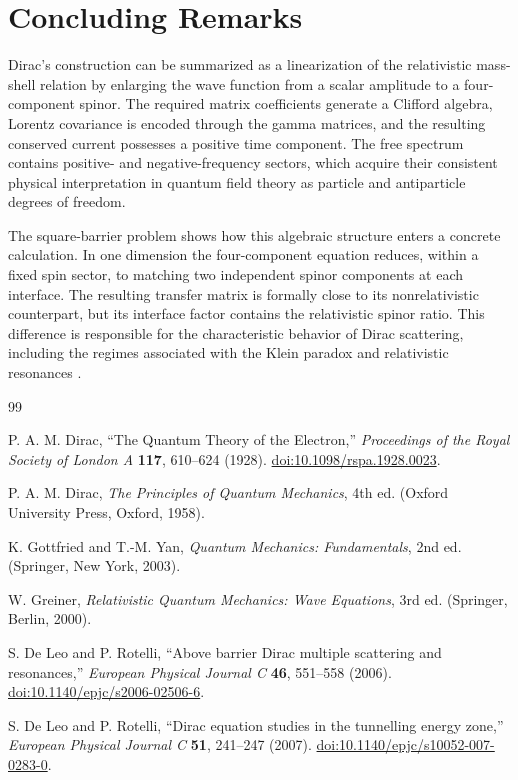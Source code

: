 \documentclass[12pt]{article}
\numberwithin{equation}{section}
\begin{document}
\section{Concluding Remarks}

Dirac's construction can be summarized as a linearization of the relativistic mass-shell relation by enlarging the wave function from a scalar amplitude to a four-component spinor. The required matrix coefficients generate a Clifford algebra, Lorentz covariance is encoded through the gamma matrices, and the resulting conserved current possesses a positive time component. The free spectrum contains positive- and negative-frequency sectors, which acquire their consistent physical interpretation in quantum field theory as particle and antiparticle degrees of freedom.

The square-barrier problem shows how this algebraic structure enters a concrete calculation. In one dimension the four-component equation reduces, within a fixed spin sector, to matching two independent spinor components at each interface. The resulting transfer matrix is formally close to its nonrelativistic counterpart, but its interface factor contains the relativistic spinor ratio. This difference is responsible for the characteristic behavior of Dirac scattering, including the regimes associated with the Klein paradox and relativistic resonances \cite{Greiner,DeLeo2006,DeLeo2007}.

\begin{thebibliography}{99}

P. A. M. Dirac,
``The Quantum Theory of the Electron,''
\textit{Proceedings of the Royal Society of London A} \textbf{117}, 610--624 (1928).
\href{https://doi.org/10.1098/rspa.1928.0023}{doi:10.1098/rspa.1928.0023}.

P. A. M. Dirac,
\textit{The Principles of Quantum Mechanics},
4th ed. (Oxford University Press, Oxford, 1958).

K. Gottfried and T.-M. Yan,
\textit{Quantum Mechanics: Fundamentals},
2nd ed. (Springer, New York, 2003).

W. Greiner,
\textit{Relativistic Quantum Mechanics: Wave Equations},
3rd ed. (Springer, Berlin, 2000).

S. De Leo and P. Rotelli,
``Above barrier Dirac multiple scattering and resonances,''
\textit{European Physical Journal C} \textbf{46}, 551--558 (2006).
\href{https://doi.org/10.1140/epjc/s2006-02506-6}{doi:10.1140/epjc/s2006-02506-6}.

S. De Leo and P. Rotelli,
``Dirac equation studies in the tunnelling energy zone,''
\textit{European Physical Journal C} \textbf{51}, 241--247 (2007).
\href{https://doi.org/10.1140/epjc/s10052-007-0283-0}{doi:10.1140/epjc/s10052-007-0283-0}.

\end{thebibliography}
\end{document}
